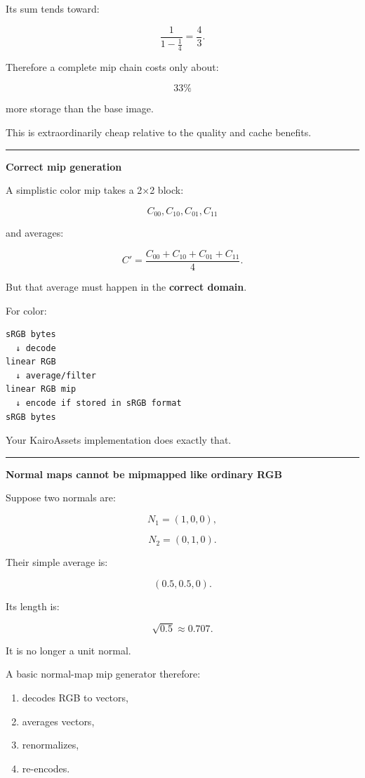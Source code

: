 Its sum tends toward:

\[
\frac{1}{1-\frac14}
=
\frac43.
\]

Therefore a complete mip chain costs only about:

\[
\boxed{33\%}
\]

more storage than the base image.

This is extraordinarily cheap relative to the quality and cache benefits.

\begin{center}\rule{0.5\linewidth}{0.5pt}\end{center}

\textbf{Correct mip generation}

A simplistic color mip takes a 2×2 block:

\[
C_{00},C_{10},C_{01},C_{11}
\]

and averages:

\[
C'=
\frac{
C_{00}+C_{10}+C_{01}+C_{11}
}{4}.
\]

But that average must happen in the \textbf{correct domain}.

For color:

\begin{verbatim}
sRGB bytes
  ↓ decode
linear RGB
  ↓ average/filter
linear RGB mip
  ↓ encode if stored in sRGB format
sRGB bytes
\end{verbatim}

Your KairoAssets implementation does exactly that.

\begin{center}\rule{0.5\linewidth}{0.5pt}\end{center}

\textbf{Normal maps cannot be mipmapped like ordinary RGB}

Suppose two normals are:

\[
N_1=(1,0,0),
\]

\[
N_2=(0,1,0).
\]

Their simple average is:

\[
(0.5,0.5,0).
\]

Its length is:

\[
\sqrt{0.5}
\approx0.707.
\]

It is no longer a unit normal.

A basic normal-map mip generator therefore:

\begin{enumerate}
\def\labelenumi{\arabic{enumi}.}
\tightlist
\item
  decodes RGB to vectors,
\item
  averages vectors,
\item
  renormalizes,
\item
  re-encodes.
\end{enumerate}

